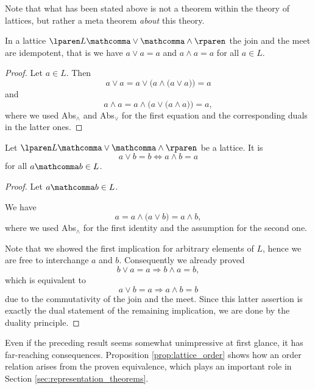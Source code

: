 Note that what has been stated above
is not a theorem within the theory of lattices,
but rather a meta theorem \emph{about} this theory.

\medskip

\begin{proposition}
  In a lattice
  $\lparen L \mathcomma \vee \mathcomma \wedge \rparen$
  the join and the meet are idempotent,
  that is we have
  $a \vee a \equal a$
  and
  $a \wedge a \equal a$
  for all
  $a \in L$.
\end{proposition}

\begin{proof}
  Let $a \in L$.
  Then
  \[
    a \vee a
    \equal
    a \vee \lparen a \wedge \lparen a \vee a \rparen \rparen
    \equal
    a
  \]
  and
  \[
    a \wedge a
    \equal
    a \wedge \lparen a \vee \lparen a \wedge a \rparen \rparen
    \equal
    a,
  \]
  where we used Abs$_{\wedge}$ and Abs$_{\vee}$ for the first equation
  and the corresponding duals in the latter ones.
\end{proof}

\begin{lemma}
  Let
  $\lparen L \mathcomma \vee \mathcomma \wedge \rparen$
  be a lattice.
  It is
  \[
    a \vee b \equal b
    \Leftrightarrow
    a \wedge b \equal a
  \]
  for all $a \mathcomma b \in L$.
\end{lemma}

\begin{proof}
  Let $a \mathcomma b \in L$.

  \fbox{$\Rightarrow$}
  We have
  \[
    a
    \equal
    a \wedge \lparen a \vee b \rparen
    \equal
    a \wedge b,
  \]
  where we used Abs$_{\wedge}$ for the first identity
  and the assumption for the second one.

  \fbox{$\Rightarrow$}
  Note that we showed the first implication for arbitrary elements of $L$,
  hence we are free to interchange $a$ and $b$.
  Consequently we already proved
  \[
    b \vee a \equal a
    \Rightarrow
    b \wedge a \equal b,
  \]
  which is equivalent to
  \[
    a \vee b \equal a
    \Rightarrow
    a \wedge b \equal b
  \]
  due to the commutativity of the join and the meet.
  Since this latter assertion is exactly
  the dual statement of the remaining implication,
  we are done by the duality principle.
\end{proof}

\medskip

Even if the preceding result seems somewhat unimpressive at first glance,
it has far-reaching consequences.
Proposition \ref{prop:lattice_order} shows how an order relation arises
from the proven equivalence,
which plays an important role in Section \ref{sec:representation_theorems}.

